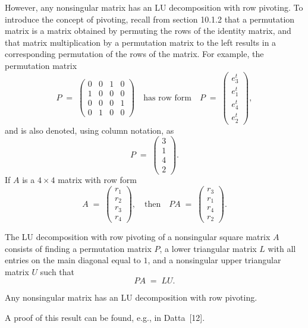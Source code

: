 However, any nonsingular matrix has an LU decomposition with row pivoting. To
introduce the concept of pivoting, recall from section 10.1.2 that a permutation
matrix is a matrix obtained by permuting the rows of the identity matrix, and that
matrix multiplication by a permutation matrix to the left results in a
corresponding permutation of the rows of the matrix. For example, the permutation
matrix
\[
P \;=\;
\begin{pmatrix} 0&0&1&0\\ 1&0&0&0\\ 0&0&0&1\\ 0&1&0&0\end{pmatrix}
\quad \text{has row form} \quad
P \;=\; \begin{pmatrix} e_3^t\\ e_1^t\\ e_4^t\\ e_2^t\end{pmatrix},
\]
and is also denoted, using column notation, as
\[
P \;=\; \begin{pmatrix} 3\\ 1\\ 4\\ 2\end{pmatrix}.
\]
If $A$ is a $4\times 4$ matrix with row form
\[
A \;=\; \begin{pmatrix} r_1\\ r_2\\ r_3\\ r_4\end{pmatrix},
\quad \text{then} \quad
PA \;=\; \begin{pmatrix} r_3\\ r_1\\ r_4\\ r_2\end{pmatrix}.
\]

\begin{definition}
The LU decomposition with row pivoting of a nonsingular square matrix $A$ consists
of finding a permutation matrix $P$, a lower triangular matrix $L$ with all entries
on the main diagonal equal to $1$, and a nonsingular upper triangular matrix $U$
such that
\[
PA \;=\; LU.
\]
\end{definition}

\begin{theorem}
Any nonsingular matrix has an LU decomposition with row pivoting.
\end{theorem}

A proof of this result can be found, e.g., in Datta~[12].

